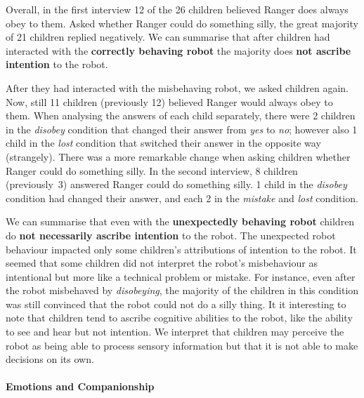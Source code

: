 \documentclass{sig-alternate}
\begin{document}
Overall, in the first interview 12 of the 26 children believed Ranger does
always obey to them. Asked whether Ranger could do something silly, the great
majority of 21 children replied negatively. We can summarise that after children
had interacted with the \textbf{correctly behaving robot} the majority does
\textbf{not ascribe intention} to the robot.

After they had interacted with the misbehaving robot, we asked children again.
Now, still 11 children (previously 12) believed Ranger would always obey to
them. When analysing the answers of each child separately, there were 2 children
in the \textit{disobey} condition that changed their answer from \textit{yes} to
\textit{no}; however also 1 child in the \textit{lost} condition that switched
their answer in the opposite way (strangely). There was a more remarkable change
when asking children whether Ranger could do something silly. In the second
interview, 8 children (previously~3) answered Ranger could do something silly. 1
child in the \textit{disobey} condition had changed their answer, and each 2 in
the \textit{mistake} and \textit{lost} condition. 

We can summarise that even with the \textbf{unexpectedly behaving robot}
children do \textbf{not necessarily ascribe intention} to the robot. The
unexpected robot behaviour impacted only some children's attributions of
intention to the robot.  It seemed that some children did not interpret the
robot's misbehaviour as intentional but more like a technical problem or
mistake. For instance, even after the robot misbehaved by \textit{disobeying},
the majority of the children in this condition was still convinced that the
robot could not do a silly thing.  It it interesting to note that children tend
to ascribe cognitive abilities to the robot, like the ability to see and hear
but not intention. We interpret that children may perceive the robot as being
able to process sensory information but that it is not able to make decisions on
its own. 

\paragraph{Emotions and Companionship}
\end{document}
